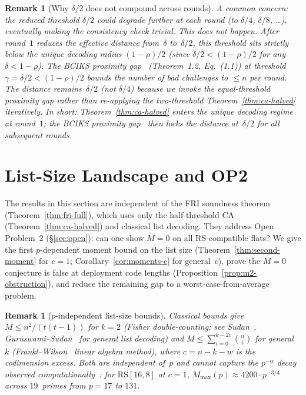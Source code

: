 \documentclass[11pt]{article}
\newtheorem{remark}[theorem]{Remark}
\newcommand{\RS}{\mathrm{RS}}
\begin{document}
\begin{remark}[Why $\delta/2$ does not compound across rounds]
\label{rem:no-compound}
A common concern: the reduced threshold $\delta/2$ could degrade further at each round (to $\delta/4$, $\delta/8$, \ldots), eventually making the consistency check trivial. This does \emph{not} happen. After round~$1$ reduces the effective distance from~$\delta$ to~$\delta/2$, this threshold sits strictly below the \emph{unique decoding radius} $(1{-}\rho)/2$ (since $\delta/2 < (1{-}\rho)/2$ for any $\delta < 1{-}\rho$). The BCIKS proximity gap~\cite{BCIKS} (Theorem~1.2, Eq.~(1.1)) at threshold $\gamma = \delta/2 < (1{-}\rho)/2$ bounds the number of bad challenges to $\leq n$ per round. The distance remains~$\delta/2$ (not $\delta/4$) because we invoke the equal-threshold proximity gap rather than re-applying the two-threshold Theorem~\ref{thm:ca-halved} iteratively. In short: Theorem~\ref{thm:ca-halved} enters the unique decoding regime at round~$1$; the BCIKS proximity gap~\cite{BCIKS} then \emph{locks} the distance at~$\delta/2$ for all subsequent rounds.
\end{remark}


\section{List-Size Landscape and OP2}
\label{sec:list-size}

The results in this section are independent of the FRI soundness theorem (Theorem~\ref{thm:fri-full}), which uses only the half-threshold CA (Theorem~\ref{thm:ca-halved}) and classical list decoding. They address Open Problem~2 (\S\ref{sec:open}): can one show $M = 0$ on all RS-compatible flats? We give the first $p$-dependent moment bound on the list size (Theorem~\ref{thm:second-moment} for $c = 1$; Corollary~\ref{cor:moments-c} for general~$c$), prove the $M = 0$ conjecture is false at deployment code lengths (Proposition~\ref{prop:m2-obstruction}), and reduce the remaining gap to a worst-case-from-average problem.

\begin{remark}[$p$-independent list-size bounds]
\label{rem:list-bounds}
Classical bounds give $M \leq n^2/(t(t{-}1))$ for $k = 2$ (Fisher double-counting; see Sudan~\cite{Sudan97}, Guruswami--Sudan~\cite{GuruswamiSudan} for general list decoding) and $M \leq \sum_{i=0}^{k-2c}\binom{n}{i}$ for general~$k$ (Frankl--Wilson~\cite{FranklWilson} linear algebra method), where $c = n{-}k{-}w$ is the codimension excess. Both are independent of~$p$ and cannot capture the $p^{-\alpha}$ decay observed computationally~\cite{CompanionRepo}: for $\RS[16,8]$ at $c = 1$, $M_{\max}(p) \approx 4200 \cdot p^{-3/4}$ across $19$~primes from $p = 17$ to $131$.
\end{remark}
\end{document}
